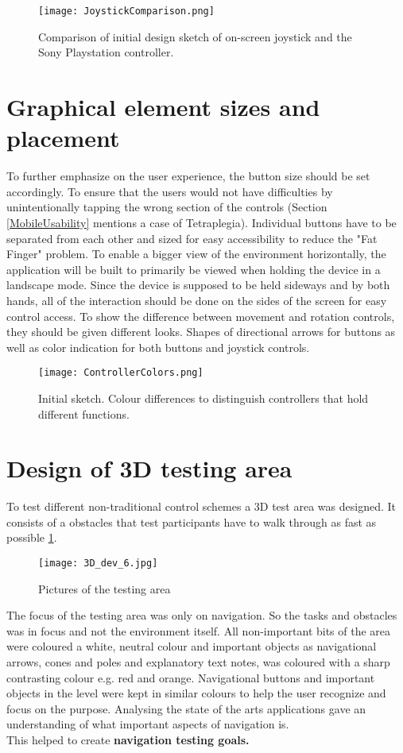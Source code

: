 \begin{figure}[H]
\centering
\texttt{[image: JoystickComparison.png]}
\caption{Comparison of initial design sketch of on-screen joystick and the Sony Playstation controller.}
\end{figure}

\section{Graphical element sizes and placement}
To further emphasize on the user experience, the button size should be set accordingly. To ensure that the users would not have difficulties by unintentionally tapping the wrong section of the controls (Section \ref{MobileUsability} mentions a case of Tetraplegia). Individual buttons have to be separated from each other and sized for easy accessibility to reduce the "Fat Finger" problem. To enable a bigger view of the environment horizontally, the application will be built to primarily be viewed when holding the device in a landscape mode. Since the device is supposed to be held sideways and by both hands, all of the interaction should be done on the sides of the screen for easy control access.
To show the difference between movement and rotation controls, they should be given different looks. Shapes of directional arrows for buttons as well as color indication for both buttons and joystick controls.

\begin{figure}[H]
\centering
\texttt{[image: ControllerColors.png]}
\caption{Initial sketch. Colour differences to distinguish controllers that hold different functions.}
\end{figure}

\section{Design of 3D testing area}\label{DesignTestArea}
To test different non-traditional control schemes a 3D test area was designed. It consists of a obstacles that test participants have to walk through as fast as possible \ref{TestLevels}.

\begin{figure}[H]
\centering
\texttt{[image: 3D\_dev\_6.jpg]}
\caption{Pictures of the testing area}
\label{TestLevels}
\end{figure}

The focus of the testing area was only on navigation. So the tasks and obstacles was in focus and not the environment itself. All non-important bits of the area were coloured a white, neutral colour and important objects as navigational arrows, cones and poles and explanatory text notes, was coloured with a sharp contrasting colour e.g. red and orange. Navigational buttons and important objects in the level were kept in similar colours to help the user recognize and focus on the purpose. 
Analysing the state of the arts applications gave an understanding of what important aspects of navigation is.
\\
This helped to create \textbf{navigation testing goals.}
